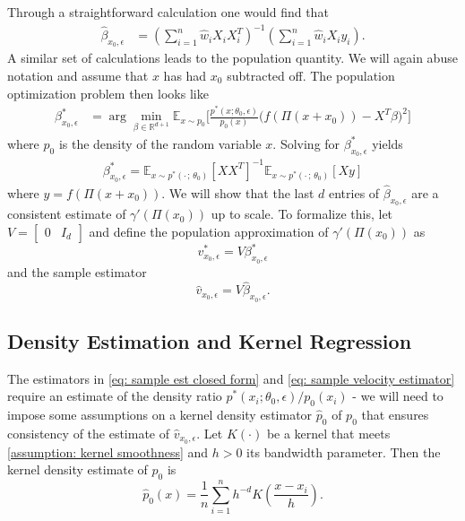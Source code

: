 \documentclass[11pt]{article}
\begin{document}
Through a straightforward calculation one would find that
\begin{align}
    \widehat{\beta}_{x_0,\epsilon} &= \left(\sum_{i = 1}^n\hat{w}_iX_iX_i^T\right)^{-1}\left(\sum_{i = 1}^n\hat{w}_iX_iy_i\right). \label{eq: sample est closed form}
\end{align}
A similar set of calculations leads to the population quantity. We will again abuse notation and assume that $x$ has had $x_0$ subtracted off. The population optimization problem then looks like
\begin{align}
\beta^*_{x_0, \epsilon} &= \arg\min_{\beta \in \mathbb{R}^{d+1}} \mathbb{E}_{x\sim p_0} \Big[\frac{p^*(x;\theta_0, \epsilon)}{p_0(x)}\Big(f(\Pi(x + x_0)) - X^{T}\beta \Big)^2\Big] \label{eq: population estimator}
\end{align}
where $p_0$ is the density of the random variable $x$. Solving for $\beta^*_{x_0, \epsilon}$ yields
\begin{align}
    \beta^*_{x_0, \epsilon} = \mathbb{E}_{x \sim p^*(\cdot\,; \, \theta_0)}\left[XX^T\right]^{-1}\mathbb{E}_{x \sim p^*(\cdot\,;\,\theta_0)}\left[Xy\right] \label{eq: population est closed form}
\end{align}
where $y = f(\Pi(x+x_0))$. We will show that the last $d$ entries of $\widehat{\beta}_{x_0,\epsilon}$ are a consistent estimate of $\gamma'(\Pi(x_0))$ up to scale. To formalize this, let $V = \begin{bmatrix} 0 & I_d\end{bmatrix}$ and define the population approximation of $\gamma'(\Pi(x_0))$ as
\begin{equation}
    v^*_{x_0, \epsilon} = V\beta^*_{x_0, \epsilon} \label{eq: population velocity estimator}
\end{equation}
and the sample estimator
\begin{equation}
    \hat{v}_{x_0, \epsilon} = V\hat{\beta}_{x_0, \epsilon}. \label{eq: sample velocity estimator}
\end{equation}

\subsection{Density Estimation and Kernel Regression}
The estimators in \cref{eq: sample est closed form} and \cref{eq: sample velocity estimator} require an estimate of the density ratio $p^*(x_i;\theta_0, \epsilon)/p_0(x_i)$ -  we will need to impose some assumptions on a kernel density estimator $\hat{p}_0$ of $p_0$ that ensures consistency of the estimate of $\hat{v}_{x_0, \epsilon}$. Let $K(\cdot)$ be a kernel that meets \cref{assumption: kernel smoothness} and $h > 0$ its bandwidth parameter. Then the kernel density estimate of $p_0$ is
\begin{equation}
    \hat{p}_0(x) = \frac{1}{n}\sum_{i = 1}^nh^{-d}K\left(\frac{x -x_i}{h}\right). \label{eq: kde}
\end{equation}
\end{document}
